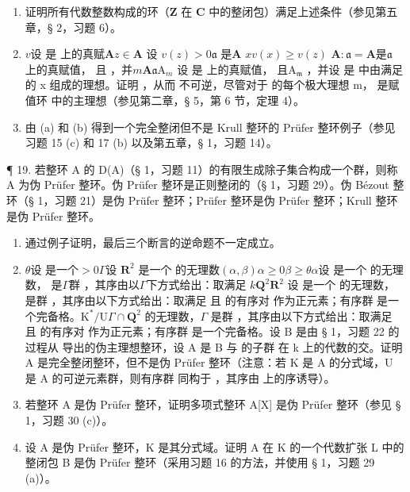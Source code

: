 \begin{enumerate}
\def\labelenumi{(\alph{enumi})}
\item
  证明所有代数整数构成的环（\(\mathbf{Z}\) 在 \(\mathbf{C}\) 中的整闭包）满足上述条件（参见第五章，§ 2，习题 6）。
\item
  \(v\)设  是  上的真赋\(\mathbf{A}\)\(z \in \mathbf{A}\) 设 \(v(z) > 0\)\(\mathfrak{a}\)  是\(\mathbf{A}\) \(x\)\(v(x) \geqslant v(z)\) \(\mathbf{A}: \mathfrak{a} = \mathbf{A}\)是\(\mathfrak{a}\)  上的真赋值， 且 ，并\(m\)\(\mathbf{A}\)\(\mathfrak{a}\mathrm{A}_{m}\) 设  是  上的真赋值， 且\(\mathrm{A}_{\mathfrak{m}}\) ，并设  是  中由满足  的 x 组成的理想。证明 ，从而  不可逆，尽管对于  的每个极大理想 m， 是赋值环  中的主理想（参见第二章，§ 5，第 6 节，定理 4）。
\item
  由 (a) 和 (b) 得到一个完全整闭但不是 Krull 整环的 Prüfer 整环例子（参见习题 15 (c) 和 17 (b) 以及第五章，§ 1，习题 14）。
\end{enumerate}

¶ 19. 若整环 A 的 D(A)（§ 1，习题 11）的有限生成除子集合构成一个群，则称 A 为伪 Prüfer 整环。伪 Prüfer 整环是正则整闭的（§ 1，习题 29）。伪 Bézout 整环（§ 1，习题 21）是伪 Prüfer 整环；Prüfer 整环是伪 Prüfer 整环；Krull 整环是伪 Prüfer 整环。

\begin{enumerate}
\def\labelenumi{(\alph{enumi})}
\item
  通过例子证明，最后三个断言的逆命题不一定成立。
\item
  \(\theta\)设  是一个\(>0\)\(\Gamma\)设 \(\mathbf{R}^2\) 是一个  的无理数\((\alpha, \beta)\)\(\alpha \geqslant 0\)\(\beta \geqslant \theta \alpha\)设  是一个  的无理数， 是\(\Gamma\)群 ，其序由以\(\Gamma\)下方式给出：取满足 \(k\)\(\mathbf{Q}^2\)\(\mathbf{R}^2\) 设  是一个  的无理数， 是群 ，其序由以下方式给出：取满足  且  的有序对  作为正元素；有序群  是一个完备格。\(\mathrm{K}^*/\mathrm{U}\)\(\Gamma \cap \mathbf{Q}^2\) 的无理数，\(\Gamma\) 是群 ，其序由以下方式给出：取满足  且  的有序对  作为正元素；有序群  是一个完备格。设 B 是由 § 1，习题 22 的过程从  导出的伪主理想整环，设 A 是 B 与  的子群  在 k 上的代数的交。证明 A 是完全整闭整环，但不是伪 Prüfer 整环（注意：若 K 是 A 的分式域，U 是 A 的可逆元素群，则有序群  同构于 ，其序由  上的序诱导）。
\item
  若整环 A 是伪 Prüfer 整环，证明多项式整环 A{[}X{]} 是伪 Prüfer 整环（参见 § 1，习题 30 (c)）。
\item
  设 A 是伪 Prüfer 整环，K 是其分式域。证明 A 在 K 的一个代数扩张 L 中的整闭包 B 是伪 Prüfer 整环（采用习题 16 的方法，并使用 § 1，习题 29 (a)）。
\end{enumerate}

